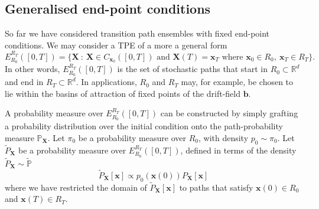 \subsection{Generalised end-point conditions} \label{sec:Generalised end-point conditions}

So far we have considered transition path ensembles with fixed end-point conditions. We may consider a TPE of a more a general form
\begin{equation}
	E_{R_0}^{R_T}([0,T]) = \{ \mathbf{X}\ :\ \mathbf{X} \in C_{\mathbf{x}_0}([0,T]) \text{ and } \mathbf{X}(T) = \mathbf{x}_T \text{ where } \mathbf{x}_0 \in R_0,\ \mathbf{x}_T \in R_T \}.
\end{equation}
In other words, $E_{R_0}^{R_T}([0,T])$ is the set of stochastic paths that start in $R_0 \subset \mathbb{R}^d$ and end in $R_T \subset \mathbb{R}^d$. In applications, $R_0$ and $R_T$ may, for example, be chosen to lie within the basins of attraction of fixed points of the drift-field $\mathbf{b}$.

A probability measure over $E_{R_0}^{R_T}([0,T])$ can be constructed by simply grafting a probability distribution over the initial condition onto the path-probability measure $\mathbb{P}_\mathbf{X}$. Let $\pi_0$ be a probability measure over $R_0$, with density $p_0 \sim \pi_0$. Let $\tilde{P}_\mathbf{X}$ be a probability measure over $E_{R_0}^{R_T}([0,T])$, defined in terms of the density $\tilde{P}_\mathbf{X} \sim \tilde{\mathbb{P}}$
\begin{equation}
	\tilde{P}_\mathbf{X}[\mathbf{x}] \propto p_0(\mathbf{x}(0)) P_\mathbf{X}[\mathbf{x}]
\end{equation}
where we have restricted the domain of $\tilde{P}_\mathbf{X}[\mathbf{x}]$ to paths that satisfy $\mathbf{x}(0) \in R_0$ and $\mathbf{x}(T) \in R_T$.

